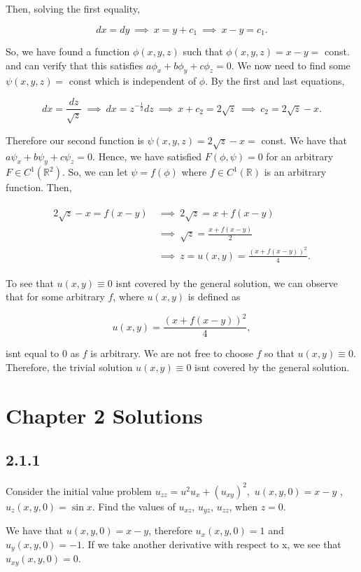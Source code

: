 \documentclass{article}
\begin{document}
\begin{flushleft}
Then, solving the first equality,

$$dx = dy ~\implies~ x = y+c_1 ~\implies~ x-y = c_1.$$

So, we have found a function $\phi(x,y,z)$ such that  $\phi(x,y,z)=x-y=$ const. and can verify that this satisfies $a\phi_x+b\phi_y+c\phi_z=0$.  We now need to find some $\psi(x,y,z)=$ const which is independent of $\phi$. By the first and last equations,

$$dx = \frac{dz}{\sqrt{z}} ~\implies~ dx= z^{-\frac{1}{2}}dz ~\implies~ x+c_2=2\sqrt{z} ~\implies~ c_2=2\sqrt{z}-x.$$

Therefore our second function is $\psi(x,y,z)=2\sqrt{z}-x=$ const. We have that $a\psi_x+b\psi_y+c\psi_z=0$. Hence, we have satisfied $F(\phi,\psi)=0$ for an arbitrary $F\in C^1(\mathbb R^2)$. So, we can let $\psi=f(\phi)$ where $f\in C^1(\mathbb R)$ is an arbitrary function. Then,

\begin{align*}
\begin{split}
2\sqrt{z}-x=f(x-y) &~\implies~ 2\sqrt{z}=x+f(x-y) \\&~\implies~
\sqrt{z}=\frac{x+f(x-y)}{2} \\&~\implies~
z=u(x,y)=\frac{(x+f(x-y))^2}{4}.
\end{split}    
\end{align*}

To see that $u(x,y)\equiv 0$ isn\textsc{}t covered by the general solution, we can observe that for some arbitrary $f$, where $u(x,y)$ is defined as

$$u(x,y)=\frac{(x+f(x-y))^2}{4},$$

isn\textsc{}t equal to 0 as $f$ is arbitrary. We are not free to choose $f$ so that $u(x,y)\equiv 0$. Therefore, the trivial solution $u(x,y)\equiv 0$ isn\textsc{}t covered by the general solution.


\section{Chapter 2 Solutions}
\subsection{\textbf{2.1.1}} Consider the initial value problem $u_{zz} = u^2u_x +(u_{xy})^2,$ $u(x,y,0) = x - y$ , $u_z ( x,y,0) = \sin x $. Find the values of $u_{xz}$, $u_{yz}$, $u_{zz}$, when $z = 0$.

We have that $u(x,y,0) = x - y$, therefore $u_x(x,y,0) = 1$ and $u_y(x,y,0) = -1$. If we take another derivative with respect to x, we see that $u_{xy}(x,y,0) = 0$.


\end{flushleft}
\end{document}
